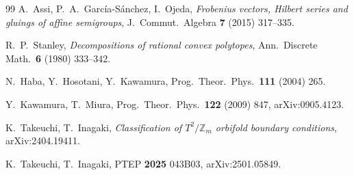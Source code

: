 \documentclass[11pt,a4paper]{article}
\theoremstyle{definition}
\newcommand{\ZZ}{\mathbb{Z}}
\begin{document}
\begin{thebibliography}{99}
 A.~Assi, P.~A.~Garc\'ia-S\'anchez, I.~Ojeda, \emph{Frobenius vectors, Hilbert series
and gluings of affine semigroups}, J.\ Commut.\ Algebra \textbf{7} (2015) 317--335. %

 R.~P.~Stanley, \emph{Decompositions of rational convex polytopes}, Ann.\ Discrete
Math.\ \textbf{6} (1980) 333--342.

 N.~Haba, Y.~Hosotani, Y.~Kawamura, Prog.\ Theor.\ Phys.\ \textbf{111} (2004) 265.

 Y.~Kawamura, T.~Miura, Prog.\ Theor.\ Phys.\ \textbf{122} (2009) 847, arXiv:0905.4123.

 K.~Takeuchi, T.~Inagaki, \emph{Classification of $T^2/\ZZ_m$ orbifold boundary
conditions}, arXiv:2404.19411. %

 K.~Takeuchi, T.~Inagaki, PTEP \textbf{2025} 043B03, arXiv:2501.05849. %

\end{thebibliography}
\end{document}
